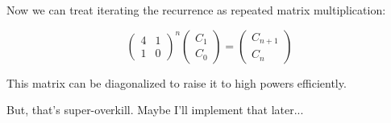Now we can treat iterating the recurrence as repeated matrix multiplication:

$$
\begin{pmatrix}
4 & 1 \\
1 & 0
\end{pmatrix}^n
\begin{pmatrix}
C_1 \\
C_0
\end{pmatrix}
=
\begin{pmatrix}
C_{n+1}  \\
C_{n}
\end{pmatrix}
$$

This matrix can be diagonalized to raise it to high powers efficiently.

But, that's super-overkill. Maybe I'll implement that later...